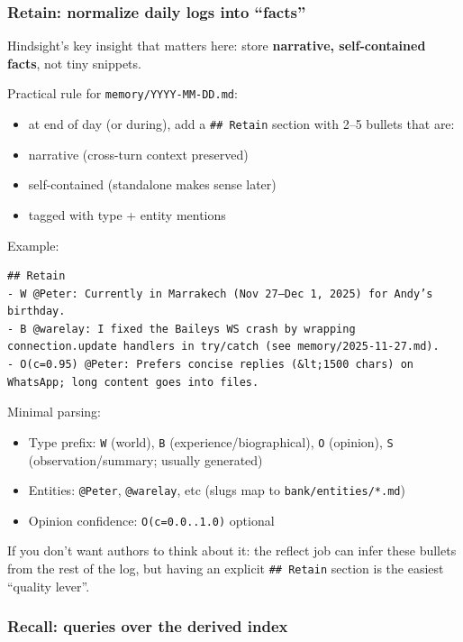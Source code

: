 \subsubsection{Retain: normalize daily logs into “facts”}


Hindsight’s key insight that matters here: store \textbf{narrative, self-contained facts}, not tiny snippets.

Practical rule for \texttt{memory/YYYY-MM-DD.md}:

\begin{itemize}
  \item at end of day (or during), add a \texttt{\#\# Retain} section with 2–5 bullets that are:
  \item narrative (cross-turn context preserved)
  \item self-contained (standalone makes sense later)
  \item tagged with type + entity mentions
\end{itemize}


Example:

\begin{lstlisting}
## Retain
- W @Peter: Currently in Marrakech (Nov 27–Dec 1, 2025) for Andy’s birthday.
- B @warelay: I fixed the Baileys WS crash by wrapping connection.update handlers in try/catch (see memory/2025-11-27.md).
- O(c=0.95) @Peter: Prefers concise replies (&lt;1500 chars) on WhatsApp; long content goes into files.
\end{lstlisting}


Minimal parsing:

\begin{itemize}
  \item Type prefix: \texttt{W} (world), \texttt{B} (experience/biographical), \texttt{O} (opinion), \texttt{S} (observation/summary; usually generated)
  \item Entities: \texttt{@Peter}, \texttt{@warelay}, etc (slugs map to \texttt{bank/entities/*.md})
  \item Opinion confidence: \texttt{O(c=0.0..1.0)} optional
\end{itemize}


If you don’t want authors to think about it: the reflect job can infer these bullets from the rest of the log, but having an explicit \texttt{\#\# Retain} section is the easiest “quality lever”.

\subsubsection{Recall: queries over the derived index}


